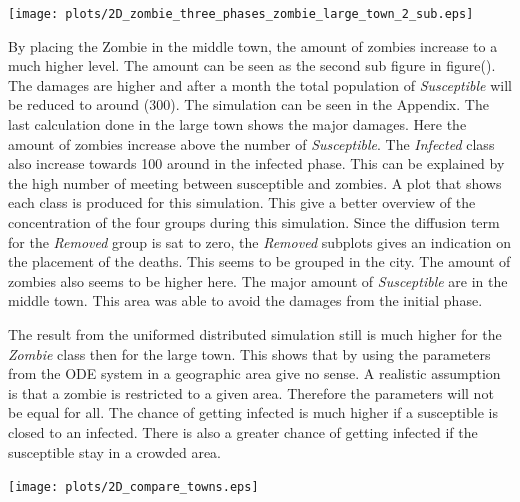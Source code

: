 \documentclass[%
twoside,                 %
final,                   %
10pt]{article}
\begin{document}
\begin{center}  %
  \centerline{\texttt{[image: plots/2D\_zombie\_three\_phases\_zombie\_large\_town\_2\_sub.eps]}}
\end{center}


By placing the Zombie in the middle town, the amount of zombies increase to a much higher level. The amount can be seen as the second sub figure in figure(). The damages are higher and after a month the total population of \emph{Susceptible} will be reduced to around (300). The simulation can be seen in the Appendix. The last calculation done in the large town shows the major damages. Here the amount of zombies increase above the number of \emph{Susceptible}. The \emph{Infected} class also increase towards 100 around in the infected phase. This can be explained by the high number of meeting between susceptible and zombies. A plot that shows each class is produced for this simulation. This give a better overview of the concentration of the four groups during this simulation. Since the diffusion term for the \emph{Removed} group is sat to zero, the \emph{Removed} subplots gives an indication on the placement of the deaths. This seems to be grouped in the city. The amount of zombies also seems to be higher here. The major amount of \emph{Susceptible} are in the middle town. This area was able to avoid the damages from the initial phase.


The result from the uniformed distributed simulation still is much higher for the \emph{Zombie} class then for the large town. This shows that by using the parameters from the ODE system in a geographic area give no sense. A realistic assumption is that a zombie is restricted to a given area. Therefore the parameters will not be equal for all. The chance of getting infected is much higher if a susceptible is closed to an infected. There is also a greater chance of getting infected if the susceptible stay in a crowded area.


\begin{center}  %
  \centerline{\texttt{[image: plots/2D\_compare\_towns.eps]}}
\end{center}


\label{table:compare_phases_zombie}
\end{document}
